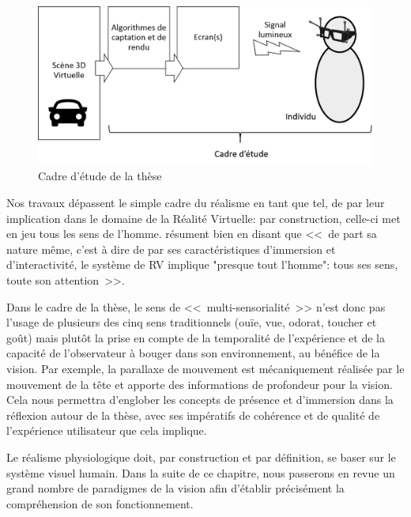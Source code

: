 	\begin{figure}[h]
		\centering
		\includegraphics[scale=.65]{Figures/CadreEtude}
		\caption{Cadre d'étude de la thèse}
		\label{fig:champ_d_etude_these}
	\end{figure}
	
	\par Nos travaux dépassent le simple cadre du réalisme en tant que tel, de par leur implication dans le domaine de la Réalité Virtuelle: par construction, celle-ci met en jeu tous les sens de l'homme. \citep{burdea_realite_1993} résument bien en disant que <<~de part sa nature même, c'est à dire de par ses caractéristiques d'immersion et d'interactivité, le système de RV implique "presque tout l'homme": tous ses sens, toute son attention~>>.
	
	\par Dans le cadre de la thèse, le sens de <<~multi-sensorialité~>> n'est donc pas l'usage de plusieurs des cinq sens traditionnels (ouïe, vue, odorat, toucher et goût) mais plutôt la prise en compte de la temporalité de l'expérience et de la capacité de l'observateur à bouger dans son environnement, au bénéfice de la vision. Par exemple, la parallaxe de mouvement est mécaniquement réalisée par le mouvement de la tête et apporte des informations de profondeur pour la vision. Cela nous permettra d'englober les concepts de présence et d'immersion dans la réflexion autour de la thèse, avec ses impératifs de cohérence et de qualité de l'expérience utilisateur que cela implique.
	
	\par Le réalisme physiologique doit, par construction et par définition, se baser sur le système visuel humain. Dans la suite de ce chapitre, nous passerons en revue un grand nombre de paradigmes de la vision afin d'établir précisément la compréhension de son fonctionnement.

